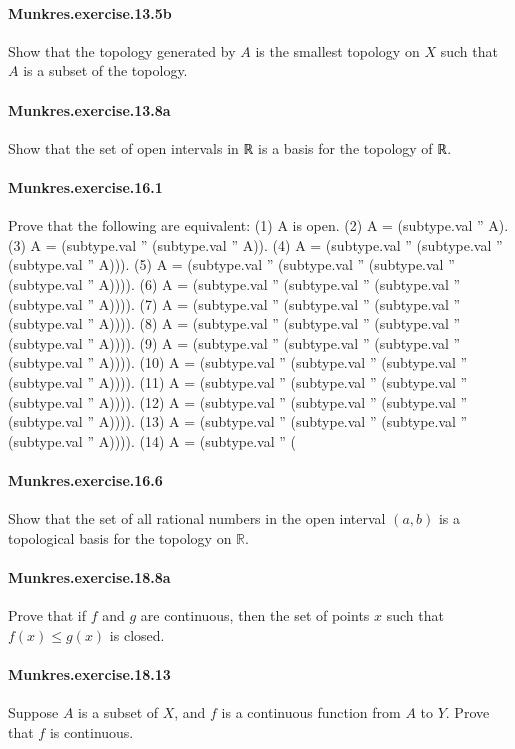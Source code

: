 \documentclass{article}
\begin{document}
{\paragraph{Munkres.exercise.13.5b} Show that the topology generated by $A$ is the smallest topology on $X$ such that $A$ is a subset of the topology.

\paragraph{Munkres.exercise.13.8a} Show that the set of open intervals in ℝ is a basis for the topology of ℝ.

\paragraph{Munkres.exercise.16.1} Prove that the following are equivalent:
  (1) A is open.
  (2) A = (subtype.val '' A).
  (3) A = (subtype.val '' (subtype.val '' A)).
  (4) A = (subtype.val '' (subtype.val '' (subtype.val '' A))).
  (5) A = (subtype.val '' (subtype.val '' (subtype.val '' (subtype.val '' A)))).
  (6) A = (subtype.val '' (subtype.val '' (subtype.val '' (subtype.val '' A)))).
  (7) A = (subtype.val '' (subtype.val '' (subtype.val '' (subtype.val '' A)))).
  (8) A = (subtype.val '' (subtype.val '' (subtype.val '' (subtype.val '' A)))).
  (9) A = (subtype.val '' (subtype.val '' (subtype.val '' (subtype.val '' A)))).
  (10) A = (subtype.val '' (subtype.val '' (subtype.val '' (subtype.val '' A)))).
  (11) A = (subtype.val '' (subtype.val '' (subtype.val '' (subtype.val '' A)))).
  (12) A = (subtype.val '' (subtype.val '' (subtype.val '' (subtype.val '' A)))).
  (13) A = (subtype.val '' (subtype.val '' (subtype.val '' (subtype.val '' A)))).
  (14) A = (subtype.val '' (

\paragraph{Munkres.exercise.16.6} Show that the set of all rational numbers in the open interval $(a, b)$ is a topological basis for the topology on $\mathbb{R}$.

\paragraph{Munkres.exercise.18.8a} Prove that if $f$ and $g$ are continuous, then the set of points $x$ such that $f(x) ≤ g(x)$ is closed.

\paragraph{Munkres.exercise.18.13} Suppose $A$ is a subset of $X$, and $f$ is a continuous function from $A$ to $Y$. Prove that $f$ is continuous.

}
\end{document}
